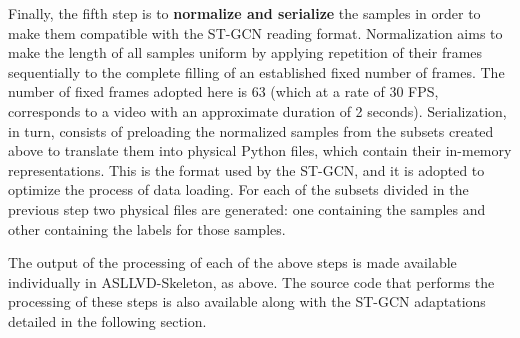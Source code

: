 Finally, the fifth step is to \textbf{normalize and serialize} the samples in order to make them compatible with the ST-GCN reading format. Normalization aims to make the length of all samples uniform by applying repetition of their frames sequentially to the complete filling of an established fixed number of frames. The number of fixed frames adopted here is 63 (which at a rate of 30 FPS, corresponds to a video with an approximate duration of 2 seconds). Serialization, in turn, consists of preloading the normalized samples from the subsets created above to translate them into physical Python \cite{python} files, which contain their in-memory representations. This is the format used by the ST-GCN, and it is adopted to optimize the process of data loading. For each of the subsets divided in the previous step two physical files are generated: one containing the samples and other containing the labels for those samples.


The output of the processing of each of the above steps is made available individually in ASLLVD-Skeleton, as above. The source code that performs the processing of these steps is also available along with the ST-GCN adaptations detailed in the following section.



